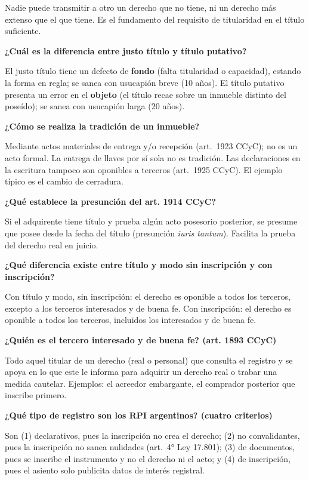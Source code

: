 \documentclass[12pt,oneside]{book}
\begin{document}
Nadie puede transmitir a otro un derecho que no tiene, ni un derecho más extenso que el que tiene. Es el fundamento del requisito de titularidad en el título suficiente.

\textbf{¿Cuál es la diferencia entre justo título y título putativo?}

El justo título tiene un defecto de \textbf{fondo} (falta titularidad o capacidad), estando la forma en regla; se sanea con usucapión breve (10 años). El título putativo presenta un error en el \textbf{objeto} (el título recae sobre un inmueble distinto del poseído); se sanea con usucapión larga (20 años).

\textbf{¿Cómo se realiza la tradición de un inmueble?}

Mediante actos materiales de entrega y/o recepción (art.\ 1923 CCyC); no es un acto formal. La entrega de llaves por sí sola no es tradición. Las declaraciones en la escritura tampoco son oponibles a terceros (art.\ 1925 CCyC). El ejemplo típico es el cambio de cerradura.

\textbf{¿Qué establece la presunción del art. 1914 CCyC?}

Si el adquirente tiene título y prueba algún acto posesorio posterior, se presume que posee desde la fecha del título (presunción \textit{iuris tantum}). Facilita la prueba del derecho real en juicio.

\textbf{¿Qué diferencia existe entre título y modo sin inscripción y con inscripción?}

Con título y modo, sin inscripción: el derecho es oponible a todos los terceros, excepto a los terceros interesados y de buena fe. Con inscripción: el derecho es oponible a todos los terceros, incluidos los interesados y de buena fe.

\textbf{¿Quién es el tercero interesado y de buena fe? (art. 1893 CCyC)}

Todo aquel titular de un derecho (real o personal) que consulta el registro y se apoya en lo que este le informa para adquirir un derecho real o trabar una medida cautelar. Ejemplos: el acreedor embargante, el comprador posterior que inscribe primero.

\textbf{¿Qué tipo de registro son los RPI argentinos? (cuatro criterios)}

Son (1) declarativos, pues la inscripción no crea el derecho; (2) no convalidantes, pues la inscripción no sanea nulidades (art.\ 4° Ley 17.801); (3) de documentos, pues se inscribe el instrumento y no el derecho ni el acto; y (4) de inscripción, pues el asiento solo publicita datos de interés registral.
\end{document}
